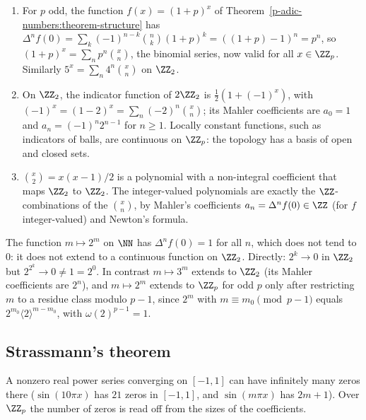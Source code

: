 \begin{example}\label{p-adic-numbers:example-mahler}
\begin{enumerate}
\item For $p$ odd, the function $f(x) = (1 + p)^x$ of Theorem~\ref{p-adic-numbers:theorem-structure} has
$\Delta^nf(0) = \sum_k(-1)^{n-k}\binom nk(1 + p)^k = ((1 + p) - 1)^n = p^n$, so $(1 + p)^x = \sum_np^n\binom xn$, the binomial series,
now valid for all $x \in \ZZ_p$. Similarly $5^x = \sum_n4^n\binom xn$ on $\ZZ_2$.
\item On $\ZZ_2$, the indicator function of $2\ZZ_2$ is $\frac12(1 + (-1)^x)$, with $(-1)^x = (1 - 2)^x = \sum_n(-2)^n\binom xn$; its Mahler coefficients are $a_0 = 1$ and $a_n = (-1)^n2^{n-1}$ for $n \geq 1$.
Locally constant functions, such as indicators of balls, are continuous on $\ZZ_p$: the topology has a basis of open and closed sets.
\item $\binom x2 = x(x - 1)/2$ is a polynomial with a non-integral coefficient that maps $\ZZ_2$ to $\ZZ_2$. The integer-valued polynomials are exactly the $\ZZ$-combinations of the $\binom xn$, by
Mahler's coefficients $a_n = \Delta^nf(0) \in \ZZ$ (for $f$ integer-valued) and Newton's formula.
\end{enumerate}
\end{example}

\begin{counterexample}\label{p-adic-numbers:counterexample-mahler}
The function $m \mapsto 2^m$ on $\NN$ has $\Delta^n f(0) = 1$ for all $n$, which does not tend to $0$: it does not extend to a continuous function on $\ZZ_2$. Directly: $2^k \to 0$ in $\ZZ_2$ but
$2^{2^k} \to 0 \neq 1 = 2^0$. In contrast $m \mapsto 3^m$ extends to $\ZZ_2$ (its Mahler coefficients are $2^n$), and $m \mapsto 2^m$ extends to $\ZZ_p$ for odd $p$ only after restricting $m$ to a
residue class modulo $p - 1$, since $2^{m}$ with $m \equiv m_0 \pmod{p - 1}$ equals $2^{m_0}\langle 2\rangle^{m - m_0}$, with $\omega(2)^{p-1} = 1$.
\end{counterexample}

\subsection{Strassmann's theorem}\label{p-adic-numbers:subsection-strassmann}

A nonzero real power series converging on $[-1, 1]$ can have infinitely many zeros there ($\sin(10\pi x)$ has $21$ zeros in $[-1, 1]$, and $\sin(m\pi x)$ has $2m + 1$). Over $\ZZ_p$ the number of zeros is read off from the sizes of the coefficients.

